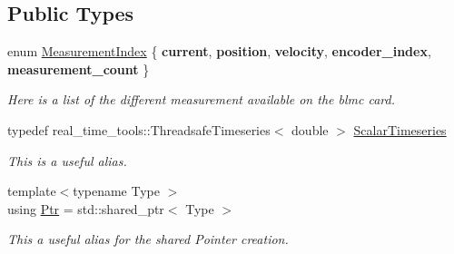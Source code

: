 \subsection*{Public Types}
\begin{DoxyCompactItemize}
\item 
\mbox{\label{classblmc__drivers_1_1MotorInterface_a35c1217dd295078c67bacc2cba08ab33}} 
enum \hyperlink{classblmc__drivers_1_1MotorInterface_a35c1217dd295078c67bacc2cba08ab33}{Measurement\+Index} \{ \newline
{\bfseries current}, 
{\bfseries position}, 
{\bfseries velocity}, 
{\bfseries encoder\+\_\+index}, 
\newline
{\bfseries measurement\+\_\+count}
 \}\begin{DoxyCompactList}\small\item\em Here is a list of the different measurement available on the blmc card. \end{DoxyCompactList}
\item 
\mbox{\label{classblmc__drivers_1_1MotorInterface_a49b8fc916b9f9debbd7b0988463db5cd}} 
typedef real\+\_\+time\+\_\+tools\+::\+Threadsafe\+Timeseries$<$ double $>$ \hyperlink{classblmc__drivers_1_1MotorInterface_a49b8fc916b9f9debbd7b0988463db5cd}{Scalar\+Timeseries}
\begin{DoxyCompactList}\small\item\em This is a useful alias. \end{DoxyCompactList}\item 
{\footnotesize template$<$typename Type $>$ }\\using \hyperlink{classblmc__drivers_1_1MotorInterface_ae31f230b9da3674a05543023c90b124c}{Ptr} = std\+::shared\+\_\+ptr$<$ Type $>$
\begin{DoxyCompactList}\small\item\em This a useful alias for the shared Pointer creation. \end{DoxyCompactList}\end{DoxyCompactItemize}
